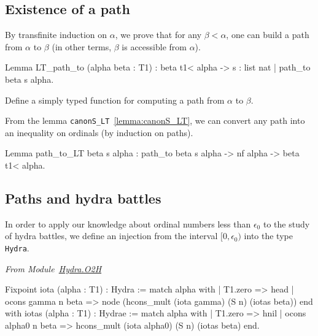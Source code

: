 \subsection{Existence of a path}


By transfinite induction on $\alpha$, we prove that for any $\beta<\alpha$, 
one can build a path from $\alpha$ to $\beta$ (in other terms, $\beta$ is accessible from $\alpha$).

\begin{Coqsrc}
Lemma LT_path_to (alpha beta : T1) :
  beta t1< alpha -> {s : list nat | path_to beta s alpha}.
\end{Coqsrc}


\begin{exercise}
Define a simply typed function for computing a path from $\alpha$ to $\beta$.
\end{exercise}


\noindent 
From the lemma \texttt{canonS\_LT}~\vref{lemma:canonS_LT}, we can convert any path into an inequality on ordinals (by induction on paths).


\begin{Coqsrc}
Lemma path_to_LT beta s alpha :
  path_to beta s alpha -> nf alpha -> beta t1< alpha.
\end{Coqsrc}

\subsection{Paths and hydra battles}
\label{KS-o2h}

In order to apply our knowledge about  ordinal numbers less than $\epsilon_0$ to the study of hydra battles, we define an injection
from the interval $[0,\epsilon_0)$ into the type \texttt{Hydra}.

\vspace{4pt}

\emph{From Module~\href{../theories/html/hydras.Hydra.O2H.html}{Hydra.O2H}}


\begin{Coqsrc}
Fixpoint iota (alpha : T1) : Hydra :=
  match alpha with
  | T1.zero => head
  | ocons gamma n beta => 
         node (hcons_mult (iota gamma) (S n) (iotas beta))
  end 
with iotas (alpha : T1) :  Hydrae :=
       match alpha with
       | T1.zero => hnil
       | ocons alpha0 n beta  => 
           hcons_mult (iota alpha0) (S n) (iotas beta)
       end.
\end{Coqsrc}  




